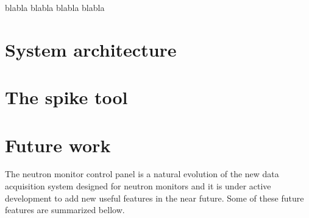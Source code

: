 \documentclass[a4paper]{jpconf}
\begin{document}
blabla \cite{Garcia2014}
blabla \cite{Medina2013}
blabla \cite{NMDB2011}
blabla \cite{Forbush1938}

\section{System architecture}


\section{The spike tool}


\section{Future work}

The neutron monitor control panel is a natural evolution of the new data
acquisition system designed for neutron monitors and it is under active
development to add new useful features in the near future. Some of these future
features are summarized bellow.
\end{document}
